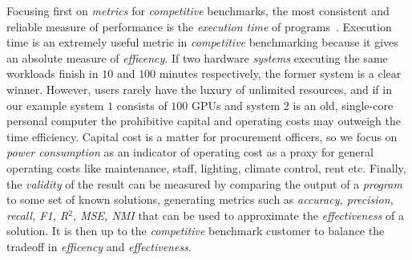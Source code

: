 Focusing first on \textit{metrics} for \textit{competitive} benchmarks, the most consistent and reliable measure of performance is the \textit{execution time} of programs~\cite{Hennessy2019}.
Execution time is an extremely useful metric in \textit{competitive} benchmarking because it gives an absolute measure of \textit{efficency}.
If two hardware \textit{systems} executing the same workloads finish in $10$ and $100$ minutes respectively, the former system is a clear winner. 
However, users rarely have the luxury of unlimited resources, and if in our example system $1$ consists of $100$ GPUs and system $2$ is an old, single-core personal computer the prohibitive capital and operating costs may outweigh the time efficiency. 
Capital cost is a matter for procurement officers, so we focus on \textit{power consumption} as an indicator of operating cost as a proxy for general operating costs like maintenance, staff, lighting, climate control, rent etc. 
Finally, the \textit{validity} of the result can be measured by comparing the output of a \textit{program} to some set of known solutions, generating metrics such as \textit{accuracy, precision, recall, F1, R$^{2}$, MSE, NMI} that can be used to approximate the \textit{effectiveness} of a solution. 
It is then up to the \textit{competitive} benchmark customer to balance the tradeoff in \textit{efficency} and \textit{effectiveness}.



